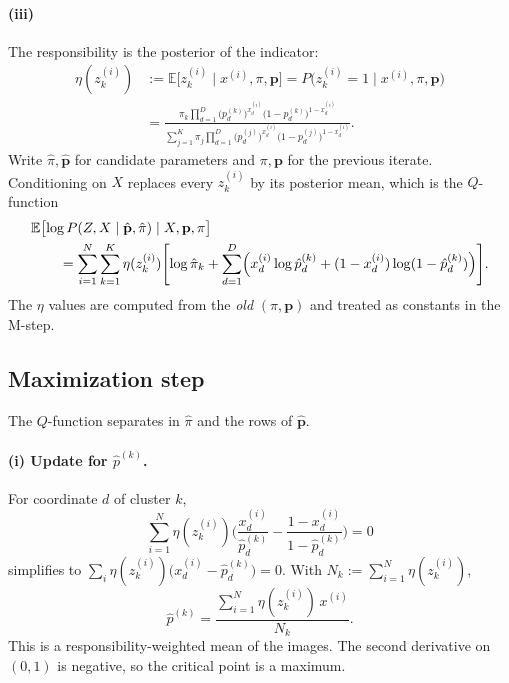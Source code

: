 \documentclass[11pt]{article}
\newcommand{\E}{\mathbb{E}}
\begin{document}
\paragraph{(iii)}
The responsibility is the posterior of the indicator:
\begin{align}
  \eta(z_k^{(i)})
  &:=\E\bigl[z_k^{(i)}\mid x^{(i)},\pi,\mathbf{p}\bigr]
  =P\bigl(z_k^{(i)}=1\mid x^{(i)},\pi,\mathbf{p}\bigr) \nonumber\\
  &=\frac{
      \pi_k\prod_{d=1}^D
      \bigl(p_d^{(k)}\bigr)^{x_d^{(i)}}
      \bigl(1-p_d^{(k)}\bigr)^{1-x_d^{(i)}}
    }{
      \sum_{j=1}^K
      \pi_j\prod_{d=1}^D
      \bigl(p_d^{(j)}\bigr)^{x_d^{(i)}}
      \bigl(1-p_d^{(j)}\bigr)^{1-x_d^{(i)}}
    }.
\end{align}
Write \(\hat\pi,\hat{\mathbf{p}}\) for candidate parameters and
\(\pi,\mathbf{p}\) for the previous iterate. Conditioning on \(X\)
replaces every \(z_k^{(i)}\) by its posterior mean, which is the
\(Q\)-function
\begin{equation}
\begin{aligned}
  &\E\bigl[\log P(Z,X\mid\hat{\mathbf{p}},\hat\pi)\mid X,\mathbf{p},\pi\bigr]\\
  &\qquad=
  \sum_{i=1}^N\sum_{k=1}^K
  \eta(z_k^{(i)})
  \Biggl[
    \log\hat\pi_k
    +\sum_{d=1}^D
    \Bigl(
      x_d^{(i)}\log\hat p_d^{(k)}
      +(1-x_d^{(i)})\log(1-\hat p_d^{(k)})
    \Bigr)
  \Biggr].
\end{aligned}
\end{equation}
The \(\eta\) values are computed from the \emph{old} \((\pi,\mathbf{p})\)
and treated as constants in the M-step.

\subsection{Maximization step}

The \(Q\)-function separates in \(\hat\pi\) and the rows of
\(\hat{\mathbf{p}}\).

\paragraph{(i) Update for \(\hat p^{(k)}\).}
For coordinate \(d\) of cluster \(k\),
\[
  \sum_{i=1}^N \eta(z_k^{(i)})
  \Biggl(
    \frac{x_d^{(i)}}{\hat p_d^{(k)}}
    -\frac{1-x_d^{(i)}}{1-\hat p_d^{(k)}}
  \Biggr)
  =0
\]
simplifies to
\(\sum_i\eta(z_k^{(i)})\bigl(x_d^{(i)}-\hat p_d^{(k)}\bigr)=0\).
With \(N_k:=\sum_{i=1}^N\eta(z_k^{(i)})\),
\begin{equation}
  \hat p^{(k)}
  =\frac{\sum_{i=1}^N \eta(z_k^{(i)})\,x^{(i)}}{N_k}.
\end{equation}
This is a responsibility-weighted mean of the images. The second
derivative on \((0,1)\) is negative, so the critical point is a maximum.
\end{document}
